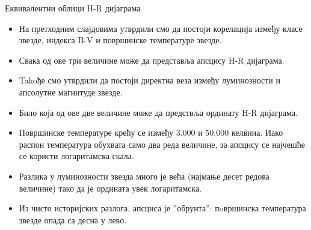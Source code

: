 \documentclass[aspectratio=169, xcolor=table, 10pt]{beamer}
\begin{document}
\begin{frame}{Еквивалентни облици H-R дијаграма}
  \begin{itemize}
    \item На претходним слајдовима утврдили смо да постоји корелација између класе звезде, индекса B-V и површинске температуре звезде.
    \item Свака од ове три величине може да представља апсцису H-R дијаграма.
    \item Takoђе смо утврдили да постоји директна веза између луминозности и апсолутне магнитуде звезде.
    \item Било која од ове две величине може да предствља ординату H-R дијаграма.
    \item Површинске температуре крећу се између 3.000 и 50.000 келвина. Иако распон температура обухвата само два реда величине, за апсцису се најчешће се користи логаритамска скала.
    \item Разлика у луминозности звезда много је већа (најмање десет редова величине) тако да је ордината увек логаритамска.
    \item Из чисто историјских разлога, апсциса је ”обрунта”: пoвршинска температура звезде опада са десна у лево.
  \end{itemize}
\end{frame}
\end{document}
